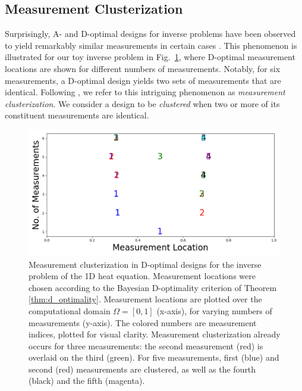 \subsection{Measurement Clusterization}
Surprisingly, A- and D-optimal designs for inverse problems have been
observed to yield remarkably similar measurements in certain cases
\citet{fedorov1996, nyberg2012, fedorov1997, Ucinski05,
  neitzel2019sparse}. This phenomenon is illustrated for our toy
inverse problem in Fig.~\ref{fig:clusterization_illustration}, where
D-optimal measurement locations are shown for different numbers of
measurements. Notably, for six measurements, a D-optimal design yields
two sets of measurements that are identical. Following
\citet{Ucinski05}, we refer to this intriguing phenomenon as
\emph{measurement clusterization}. We consider a design to be
\emph{clustered} when two or more of its constituent measurements are
identical.

\begin{figure}
    \centering
    \includegraphics[height=0.5\textwidth]{figs/dst_modelError0.png}
    \caption{Measurement clusterization in D-optimal designs for the
      inverse problem of the 1D heat equation. Measurement locations
      were chosen according to the Bayesian D-optimality criterion of
      Theorem \ref{thm:d_optimality}. Measurement locations are
      plotted over the computational domain \(\Omega = [0, 1]\)
      (x-axis), for varying numbers of measurements (y-axis). The
      colored numbers are measurement indices, plotted for visual
      clarity. Measurement clusterization already occurs for three
      measurements: the second measurement (red) is overlaid on the
      third (green). For five measurements, first (blue) and second
      (red) measurements are clustered, as well as the fourth (black)
      and the fifth (magenta).}
  \label{fig:clusterization_illustration}
\end{figure}


